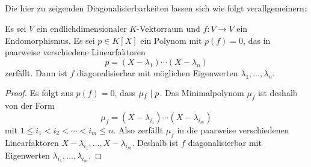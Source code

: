 \subsection{}

Die hier zu zeigenden Diagonalisierbarkeiten lassen sich wie folgt verallgemeinern:

\begin{lemma}
  \label{lemma: diagonalizable via polynomials}
  Es sei $V$ ein endlichdimensionaler $K$-Vektorraum und $f \colon V \to V$ ein Endomorphismus.
  Es sei $p \in K[X]$ ein Polynom mit $p(f) = 0$, das in paarweise verschiedene Linearfaktoren
  \[
    p = (X - \lambda_1) \dotsm (X - \lambda_n)
  \]
  zerfällt.
  Dann ist $f$ diagonalisierbar mit möglichen Eigenwerten $\lambda_1, \dotsc, \lambda_n$.
\end{lemma}

\begin{proof}
  Es folgt aus $p(f) = 0$, dass $\mu_f \mathrel{|} p$.
  Das Minimalpolynom $\mu_f$ ist deshalb von der Form
  \[
      \mu_f
    = (X - \lambda_{i_1}) \dotsm (X - \lambda_{i_m})
  \]
  mit $1 \leq i_1 < i_2 < \dotsb < i_m \leq n$.
  Also zerfällt $\mu_f$ in die paarweise verschiedenen Linearfaktoren $X - \lambda_{i_1}, \dotsc, X - \lambda_{i_m}$.
  Deshalb ist $f$ diagonalisierbar mit Eigenwerten $\lambda_{i_1}, \dotsc, \lambda_{i_m}$.
\end{proof}

